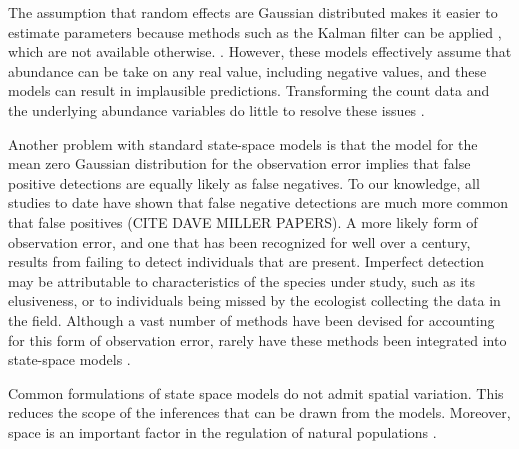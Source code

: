 \documentclass[12pt]{article}
\begin{document}
The assumption that random effects are Gaussian distributed makes it
easier to estimate parameters because methods such as the Kalman
filter can be applied %
\citep{dennis_etal:2006}, which are not available otherwise. %
\citep{devalpine_hastings:2002}. %
However, these models effectively assume that abundance can be take on any
real value, including negative values, 
and these models can result in implausible predictions.
Transforming the count data and the underlying abundance variables 
do little to resolve these issues \citep{ohara_kotze:2010}.

Another problem with standard state-space models is that the model for
the mean zero Gaussian distribution for the observation error
implies that false positive detections are
equally likely as false negatives. To our knowledge, all studies to
date have shown that false negative detections are much more common
that false positives (CITE DAVE MILLER PAPERS). 
A more likely form of observation error, and one that has been recognized for well
over a century, results from failing to detect individuals that are
present. Imperfect detection may be attributable to
characteristics of the species under study, such as its elusiveness,
or to individuals being missed by the ecologist collecting the data in the field.
Although a vast number of methods have been devised for accounting for
this form of observation error, rarely have these methods been
integrated into state-space models \citep[but
see][]{buckland_etal:2004}.

Common formulations of state space models do not admit
spatial variation. This reduces the scope of the inferences that can
be drawn from the models. Moreover, space is an important factor in the
regulation of natural populations \citep{murdoch:1994,
pulliam:1988, gill_etal:2001}.
\end{document}

